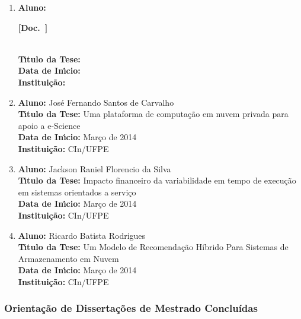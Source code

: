 \documentclass[a4paper,oneside,10pt]{article}
\newcounter{document}%
\newcommand\Doc{{\addtocounter{document}{1}\mbox{\sffamily\bfseries [Doc. \arabic{document}]}}}
\begin{document}
\begin{enumerate}
\renewcommand{\labelenumi}{{\large\bfseries\arabic{enumi}.}}

\item       \textbf{Aluno:}  \Doc \\
            \textbf{T\'{\i}tulo da Tese:} \\
            \textbf{Data de In\'{\i}cio:}  \\
            \textbf{Institui\c{c}\~{a}o:} 

\item       \textbf{Aluno:} José Fernando Santos de Carvalho \mbox{} \\
            \textbf{T\'{\i}tulo da Tese:} Uma plataforma de computação em nuvem privada para apoio a e-Science \\
            \textbf{Data de In\'{\i}cio:} Março de 2014 \\
            \textbf{Institui\c{c}\~{a}o:} CIn/UFPE

\item       \textbf{Aluno:} Jackson Raniel Florencio da Silva \mbox{} \\
            \textbf{T\'{\i}tulo da Tese:} Impacto financeiro da variabilidade em tempo de execução em sistemas orientados a serviço\\
            \textbf{Data de In\'{\i}cio:} Março de 2014 \\
            \textbf{Institui\c{c}\~{a}o:} CIn/UFPE

\item       \textbf{Aluno:} Ricardo Batista Rodrigues \mbox{} \\
            \textbf{T\'{\i}tulo da Tese:} Um Modelo de Recomendação Híbrido Para Sistemas de Armazenamento em Nuvem\\
            \textbf{Data de In\'{\i}cio:} Março de 2014\\
            \textbf{Institui\c{c}\~{a}o:} CIn/UFPE 
            

\end{enumerate}


\subsubsection{Orienta\c{c}\~{a}o de Disserta\c{c}\~{o}es de Mestrado Conclu\'{i}das}
\vspace{0.3cm}
\end{document}

